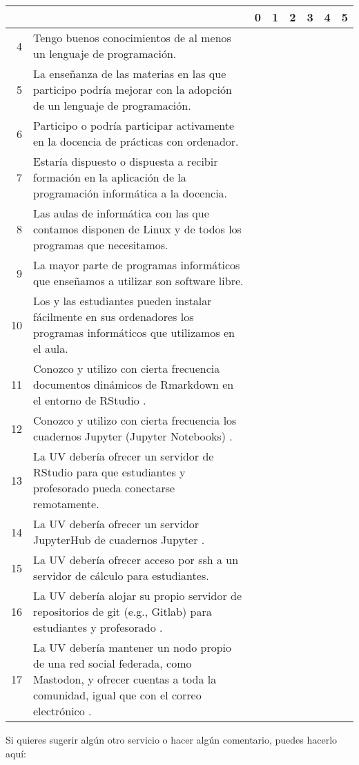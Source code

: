 \documentclass[a4paper,12pt]{article}
\begin{document}
{\small
\begin{tabular}{|r|p{9cm}|c|c|c|c|c|c|}
\toprule
&&0&1&2&3&4&5\\
\midrule
4&Tengo buenos conocimientos de al menos un lenguaje de programación.&&&&&&\\
\midrule
5&La enseñanza de las materias en las que participo podría mejorar con la adopción de un lenguaje de programación.&&&&&&\\
\midrule
6&Participo o podría participar activamente en la docencia de prácticas con ordenador.&&&&&&\\
\midrule
7&Estaría dispuesto o dispuesta a recibir formación en la aplicación de la programación informática a la docencia.&&&&&&\\
\midrule
8&Las aulas de informática con las que contamos disponen de Linux y de todos los programas que necesitamos.&&&&&&\\
\midrule
9&La mayor parte de programas informáticos que enseñamos a utilizar son software libre.&&&&&&\\
\midrule
10&Los y las estudiantes pueden instalar fácilmente en sus ordenadores los programas informáticos que utilizamos en el aula.&&&&&&\\
\midrule
11&Conozco y utilizo con cierta frecuencia documentos dinámicos de Rmarkdown en el entorno de RStudio \cite{RStudio}.&&&&&&\\
\midrule
12&Conozco y utilizo con cierta frecuencia los cuadernos Jupyter (Jupyter Notebooks) \cite{Barba2019}.&&&&&&\\
\midrule
13&La UV debería ofrecer un servidor de RStudio para que estudiantes y profesorado pueda conectarse remotamente.&&&&&&\\
\midrule
14&La UV debería ofrecer un servidor JupyterHub de cuadernos Jupyter \cite{JupyterHub}.&&&&&&\\
\midrule
15&La UV debería ofrecer acceso por \textsf{ssh} a un servidor de cálculo para estudiantes.&&&&&&\\
\midrule
16&La UV debería alojar su propio servidor de repositorios de \textsf{git} (e.g., Gitlab) para estudiantes y profesorado \cite{Paderborn2023,PereiraBraga2023}.&&&&&&\\
\midrule
17&La UV debería mantener un nodo propio de una red social federada, como Mastodon, y ofrecer cuentas a toda la comunidad, igual que con el correo electrónico \cite{Brembs2023,mastodon}.&&&&&&\\
\bottomrule
\end{tabular}
}

Si quieres sugerir algún otro servicio o hacer algún comentario, puedes hacerlo aquí:
\vspace*{3cm}



\end{document}
